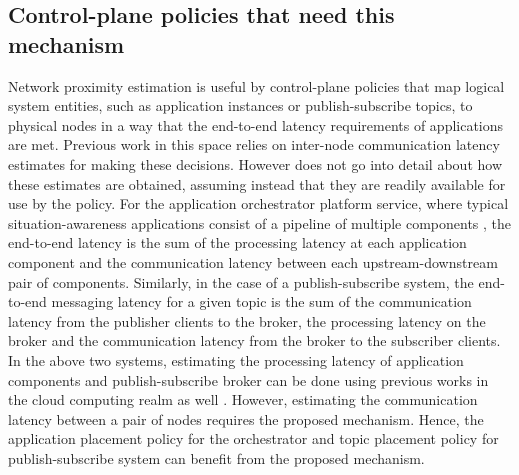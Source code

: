 \subsection{Control-plane policies that need this mechanism}
Network proximity estimation is useful by control-plane policies that map logical system entities, such as application instances or publish-subscribe topics, to physical nodes in a way that the end-to-end latency requirements of applications are met. Previous work in this space \cite{amarasinghe2018data,naas2017ifogstor,liu2019mobility} relies on inter-node communication latency estimates for making these decisions. However does not go into detail about how these estimates are obtained, assuming instead that they are readily available for use by the policy. For the application orchestrator platform service, where typical situation-awareness applications  consist of a pipeline of multiple components \cite{ananthanarayanan2017real,das2018edgebench}, the end-to-end latency is the sum of the processing latency at each application component and the communication latency between each upstream-downstream pair of components. Similarly, in the case of a publish-subscribe system, the end-to-end messaging latency for a given topic is the sum of the communication latency from the publisher clients to the broker, the processing latency on the broker and the communication latency from the broker to the subscriber clients. In the above two systems, estimating the processing latency of application components and publish-subscribe broker can be done using previous works in the cloud computing realm as well \cite{khare2018scalable}. However, estimating the communication latency between a pair of nodes requires the proposed mechanism. Hence, the application placement policy for the orchestrator and topic placement policy for publish-subscribe system can benefit from the proposed mechanism. 

